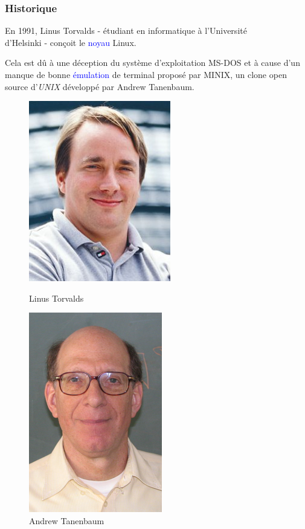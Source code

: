 \documentclass[aspectratio=169]{beamer}
\begin{document}
\begin{frame}
  \frametitle{Historique}
  En 1991, Linus Torvalds - étudiant en informatique à l'Université \\
  d'Helsinki - conçoit le \textcolor{blue}{noyau} Linux.

  \hspace{0.5cm}

  Cela est dû à une déception du système d'exploitation MS-DOS et à cause d'un
manque de bonne \textcolor{blue}{émulation} de terminal proposé par MINIX, un
clone open source d'\textit{UNIX} développé par Andrew Tanenbaum.

\begin{figure}
\centering
\begin{minipage}{.455\textwidth}
  \centering
  \includegraphics[width=.45\linewidth]{textures/images/unix/torvalds.jpg}
  \caption{Linus Torvalds}
\end{minipage}
\begin{minipage}{.39\textwidth}
  \centering
  \includegraphics[width=.45\linewidth]{textures/images/unix/tanenbaum.png}
  \caption{Andrew Tanenbaum}
\end{minipage}
\end{figure}
\end{frame}
\end{document}
